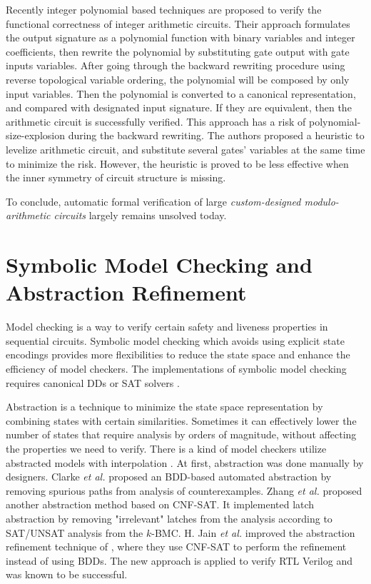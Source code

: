 Recently integer polynomial based techniques \cite{ciesielski2014function,rolf:date16} are proposed  to verify the functional 
correctness of integer arithmetic circuits. Their approach formulates the output signature as a polynomial function 
with binary variables and integer coefficients, then rewrite the polynomial by substituting gate output with gate inputs
variables. After going through the backward rewriting procedure using reverse topological variable ordering, the polynomial
will be composed by only input variables. Then the polynomial is converted to a canonical representation, and compared
with designated input signature. If they are equivalent, then the arithmetic circuit is successfully verified.
This approach has a risk of polynomial-size-explosion during the backward rewriting. The authors proposed a heuristic
to levelize arithmetic circuit, and substitute several gates' variables at the same time to minimize the risk. However, 
the heuristic is proved to be less effective when the inner symmetry of circuit structure is missing.

To conclude, automatic formal verification of large {\it
    custom-designed modulo-arithmetic circuits} largely remains
  unsolved today.
  
\section{Symbolic Model Checking and Abstraction Refinement}
Model checking is a way to verify certain safety and liveness properties 
in sequential circuits. Symbolic model checking which avoids using explicit state encodings
provides more flexibilities to reduce the state space and enhance the 
efficiency of model checkers. The implementations of symbolic model checking 
requires canonical DDs or SAT solvers \cite{burch1990sequential,burch1991representing,biere1999symbolic,biere1999symbolic}.

Abstraction is a technique to minimize the state space representation by combining states with certain 
similarities. Sometimes it can effectively lower the number of states that require analysis by orders of magnitude,
without affecting the properties we need to verify. There is a kind of model checkers utilize abstracted models 
with interpolation \cite{mcmillan2003interpolation,mcmillan:cav06}.
At first, abstraction was done manually by designers. Clarke {\it et al.} \cite{clarke2000counterexample}
proposed an BDD-based automated abstraction by removing spurious paths from analysis of counterexamples. 
Zhang {\it et al.} \cite{zhang2005design} proposed another abstraction method based on CNF-SAT.
It implemented latch abstraction by removing "irrelevant" latches from the analysis
according to SAT/UNSAT analysis from the $k$-BMC. H. Jain {\it et al.} \cite{HimanshuDAC2005} improved the abstraction refinement technique of \cite{clarke2000counterexample},
where they use CNF-SAT to perform the refinement instead of using BDDs. The new approach is applied to verify RTL Verilog
and was known to be successful.

